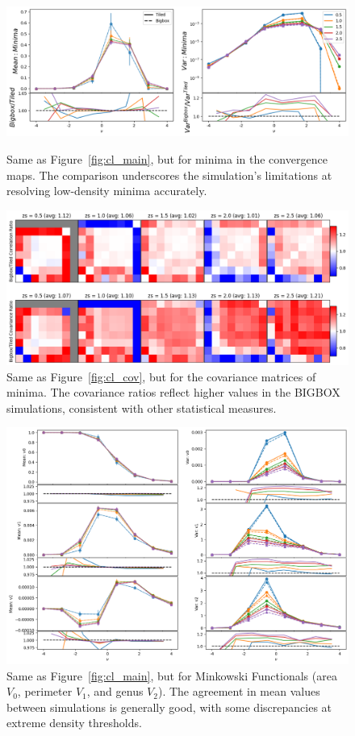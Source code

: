 \begin{figure}[p]
    \centering
    \includegraphics[width=\textwidth]{figures/results/minima_main.png}
    \caption{Same as Figure~\ref{fig:cl_main}, but for minima in the convergence maps. The comparison underscores the simulation's limitations at resolving low-density minima accurately.}
    \label{fig:min_main}
    \vspace{2cm}
    \includegraphics[width=\textwidth]{figures/results/minima_cov.png}
    \caption{Same as Figure~\ref{fig:cl_cov}, but for the covariance matrices of minima. The covariance ratios reflect higher values in the BIGBOX simulations, consistent with other statistical measures.}
    \label{fig:min_cov}
\end{figure}

\begin{figure}[p]
    \centering
    \includegraphics[width=\textwidth]{figures/results/mfs_main.png}
    \caption{Same as Figure~\ref{fig:cl_main}, but for Minkowski Functionals (area $V_0$, perimeter $V_1$, and genus $V_2$). The agreement in mean values between simulations is generally good, with some discrepancies at extreme density thresholds.}
    \label{fig:mfs_main}
\end{figure}

